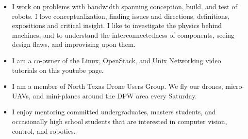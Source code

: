 \documentclass[12pt,a4paper]{article}
\begin{document}
\begin{itemize}
	\item	I work on problems with bandwidth spanning conception, build, and test of robots. I love conceptualization, finding issues and directions, definitions, expositions and critical insight. I like to investigate the physics behind machines, and to understand the interconnectedness of components, seeing design flaws, and improvising upon them.
	\item	I am a co-owner of the Linux, OpenStack, and Unix Networking video tutorials on this youtube page.
	\item	I am a member of North Texas Drone Users Group. We fly our drones, micro-UAVs, and mini-planes around the DFW area every Saturday.
	\item	I enjoy mentoring committed undergraduates, masters students, and occasionally high school students that are interested in computer vision, control, and robotics.
	
\end{itemize}
\end{document}
